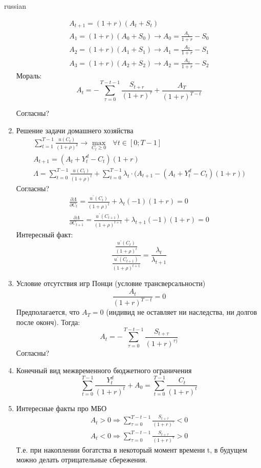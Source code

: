 \documentclass{article}
\begin{document}
\begin{otherlanguage*}{russian}
\begin{enumerate}
\begin{align}
A_{t+1} = (1 + r) (A_t + S_t)  \\
A_1 = (1 + r) (A_0 + S_0) \rightarrow A_0 = \frac{A_1}{1+r} - S_0 \\
A_2 = (1 + r) (A_1 + S_1) \rightarrow A_1 = \frac{A_2}{1 + r} - S_1 \\
A_3 = (1 + r) (A_2 + S_2) \rightarrow A_2 = \frac{A_3}{1 + r} - S_2
\end{align}
Мораль: 
\begin{equation}
A_t = - \sum_{\tau = 0}^{T-t-1} \frac{S_{t+r}}{(1 + r)^{\tau}} + \frac{A_T}{(1+r)^{T-t}}
\end{equation}

Согласны?
\item Решение задачи домашнего хозяйства
\begin{align}
\sum_{t=1}^{T-1} \frac{u(C_t)}{(1 + \rho)^2} \rightarrow \max_{C_t \ge 0} \,\,\,\, \forall t \in [0; T -1]\\
A_{t+1} = (A_t + Y^d_t - C_t) (1 + r)  \\
\Lambda = \sum_{t=0}^{T-1} \frac{u(C_t)}{(1 + \rho)^t} + \sum_{t=0}^{T-1} \lambda_t \cdot \Big( A_{t+1} - (A_t + Y^d_t - C_t) (1 + r) \Big)
\end{align}
Согласны?
\begin{align}
\frac{\partial \Lambda}{\partial C_t} = \frac{u^{'}(C_t)}{(1 + \rho)^t} + \lambda_t (-1) (1 + r) =  0 \\
\frac{\partial \Lambda}{\partial C_{t+1}} = \frac{u^{'}(C_{t+1})}{(1 + \rho)^{t+1}} + \lambda_{t+1} (-1) (1+r) = 0
\end{align}
Интересный факт: 
\begin{equation}
\frac{\frac{u^{'}(C_t)}{(1 + \rho)^t}}
{\frac{u^{'}(C_{t+1})}{(1 + \rho)^{t+1}}} = \frac{\lambda_t}{\lambda_{t+1}}
\end{equation}
\item Условие отсутствия игр Понци (условие трансверсальности) 
\begin{equation}
\frac{A_t}{(1+r)^{T - t}} = 0
\end{equation}
Предполагается, что $A_T = 0 $ (индивид не оставляет ни наследства, ни долгов после оконч). Тогда: 
\begin{equation}
A_t = - \sum_{\tau = 0}^{T-t-1} \frac{S_{t + \tau}}{(1 + r)^{\tau)}}
\end{equation}
Согласны?
\item Конечный вид межвременного бюджетного ограничения
\begin{equation}
\sum_{t=0}^{T-1} \frac{Y^d_t}{(1 + r)^t} + A_0 = \sum_{t=0}^{T-1} \frac{C_t}{(1+r)^t}
\end{equation}
\item Интересные факты про МБО 
\begin{align}
A_t > 0 \Rightarrow \sum_{\tau = 0}^{T-t-1} \frac{S_{t + \tau}}{(1 + r)^{\tau}} < 0 \\
A_t < 0 \Rightarrow \sum_{\tau = 0}^{T-t-1} \frac{S_{t + \tau}}{(1 + r)^{\tau}} > 0
\end{align}
Т.е. при накоплении богатства в некоторый момент времени t, в будущем можно делать отрицательные сбережения. 


\end{enumerate}
\end{otherlanguage*}
\end{document}
